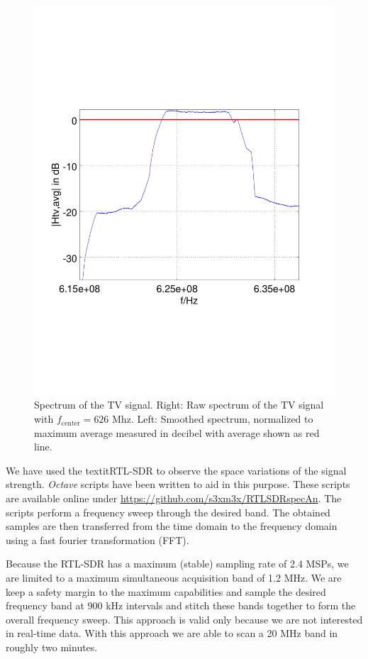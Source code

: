\documentclass[conference]{IEEEtran}
\begin{document}
\begin{figure}[h]
\begin{minipage}{0.49\columnwidth}
	\includegraphics[width=\columnwidth]{./fig/626mhz_filtered}
	\end{minipage}
	\caption{Spectrum of the TV signal. Right: Raw spectrum of the TV signal with \ensuremath{f_{\text{center}}=\text{626 Mhz}}. Left: Smoothed spectrum, normalized to maximum average measured in decibel with average shown as red line.}
	\label{fig:tv_record} 
\end{figure}

We have used the textit{RTL-SDR} to observe the space variations of the
signal strength. \textit{Octave} scripts have been written to aid in
this purpose. These scripts are available online under
\url{https://github.com/s3xm3x/RTLSDRspecAn}. The scripts perform a
frequency sweep through the desired band. The obtained samples are then
transferred from the time domain to the frequency domain using a fast
fourier transformation (FFT). 

Because the RTL-SDR has a maximum (stable) sampling rate of 2.4 MSPs, we
are limited to a maximum simultaneous acquisition band of 1.2 MHz. We
are keep a safety margin to the maximum capabilities and sample the
desired frequency band at 900 kHz intervals and stitch these bands
together to form the overall frequency sweep. This approach is valid
only because we are not interested in real-time data.  With this
approach we are able to scan a 20 MHz band in roughly two minutes.
\end{document}
